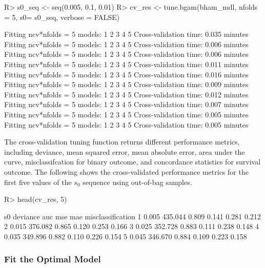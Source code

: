 \documentclass[
]{jss}
\begin{document}
\begin{CodeChunk}
\begin{CodeInput}
R> s0_seq <- seq(0.005, 0.1, 0.01)
R> cv_res <- tune.bgam(bham_mdl, nfolds = 5, s0= s0_seq, verbose = FALSE)
\end{CodeInput}
\begin{CodeOutput}
Fitting ncv*nfolds = 5 models: 
1 2 3 4 5 
 Cross-validation time: 0.035 minutes 
Fitting ncv*nfolds = 5 models: 
1 2 3 4 5 
 Cross-validation time: 0.006 minutes 
Fitting ncv*nfolds = 5 models: 
1 2 3 4 5 
 Cross-validation time: 0.006 minutes 
Fitting ncv*nfolds = 5 models: 
1 2 3 4 5 
 Cross-validation time: 0.011 minutes 
Fitting ncv*nfolds = 5 models: 
1 2 3 4 5 
 Cross-validation time: 0.016 minutes 
Fitting ncv*nfolds = 5 models: 
1 2 3 4 5 
 Cross-validation time: 0.009 minutes 
Fitting ncv*nfolds = 5 models: 
1 2 3 4 5 
 Cross-validation time: 0.012 minutes 
Fitting ncv*nfolds = 5 models: 
1 2 3 4 5 
 Cross-validation time: 0.007 minutes 
Fitting ncv*nfolds = 5 models: 
1 2 3 4 5 
 Cross-validation time: 0.005 minutes 
Fitting ncv*nfolds = 5 models: 
1 2 3 4 5 
 Cross-validation time: 0.005 minutes 
\end{CodeOutput}
\end{CodeChunk}

The cross-validation tuning function returns different performance
metrics, including deviance, mean squared error, mean absolute error,
area under the curve, misclassifcation for binary outcome, and
concordance statistics for survival outcome. The following shows the
cross-validated performance metrics for the first five values of the
\(s_0\) sequence using out-of-bag samples.

\begin{CodeChunk}
\begin{CodeInput}
R> head(cv_res, 5)
\end{CodeInput}
\begin{CodeOutput}
     s0 deviance   auc   mse   mae misclassification
1 0.005  435.044 0.809 0.141 0.281             0.212
2 0.015  376.082 0.865 0.120 0.253             0.166
3 0.025  352.728 0.883 0.111 0.238             0.148
4 0.035  349.896 0.882 0.110 0.226             0.154
5 0.045  346.670 0.884 0.109 0.223             0.158
\end{CodeOutput}
\end{CodeChunk}

\subsubsection{Fit the Optimal Model}
\end{document}
